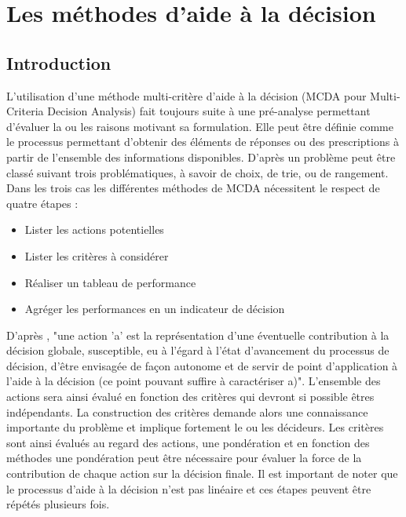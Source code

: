 
\section{Les méthodes d’aide à la décision} %
\label{sec:les_methodes_d_aide_à_la_decision}
\subsection{Introduction} %
\label{sub:introduction}
L’utilisation d’une méthode multi-critère d’aide à la décision (MCDA pour Multi-Criteria
Decision Analysis) fait toujours suite à une pré-analyse permettant d’évaluer la ou les
raisons motivant sa formulation. Elle peut être définie comme le processus permettant
d’obtenir des éléments de réponses ou des prescriptions à partir de l’ensemble des
informations disponibles. D’après  un problème peut être
classé suivant trois problématiques, à savoir de choix, de trie, ou de rangement. Dans les
trois cas les différentes méthodes de MCDA nécessitent le respect de quatre étapes :
\begin{itemize}
  \item Lister les actions potentielles
  \item Lister les critères à considérer
  \item Réaliser un tableau de performance
  \item Agréger les performances en un indicateur de décision
\end{itemize}
D’après , "une action 'a' est la représentation d’une
éventuelle contribution à la décision globale, susceptible, eu à l’égard à l’état
d’avancement du processus de décision, d’être envisagée de façon autonome et de
servir de point d’application à l’aide à la décision (ce point pouvant suffire à
caractériser a)". L’ensemble des actions sera ainsi évalué en fonction des
critères qui devront si possible êtres indépendants. La construction des critères
demande alors une connaissance importante du problème et implique fortement le
ou les décideurs. Les critères sont ainsi évalués au regard des actions, une pondération
et en fonction des méthodes une pondération peut être nécessaire pour évaluer la force
de la contribution de chaque action sur la décision finale. Il est important de noter
que le processus d’aide à la décision n’est pas linéaire et ces étapes peuvent
être répétés plusieurs fois.


